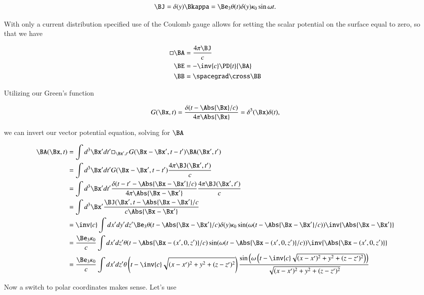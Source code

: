 \begin{equation}\label{eqn:relElectroDynProblemSet5P1:30}
\BJ = \delta(y) \Bkappa = \Be_3 \theta(t) \delta(y) \kappa_0 \sin\omega t.
\end{equation}

With only a current distribution specified use of the Coulomb gauge allows for setting the scalar potential on the surface equal to zero, so that we have

\begin{align}\label{eqn:relElectroDynProblemSet5P1:50}
\square \BA &= \frac{4 \pi \BJ}{c} \\
\BE &= - \inv{c} \PD{t}{\BA} \\
\BB &= \spacegrad \cross \BB
\end{align}

Utilizing our Green's function 

\begin{equation}\label{eqn:relElectroDynProblemSet5P1:70}
G(\Bx, t) = \frac{\delta(t - \Abs{\Bx}/c)}{4 \pi \Abs{\Bx}} = \delta^3(\Bx)\delta(t),
\end{equation}

we can invert our vector potential equation, solving for $\BA$

\begin{align*}
\BA(\Bx, t) 
&= \int d^3 \Bx' dt' \square_{\Bx', t'} G(\Bx - \Bx', t - t') \BA(\Bx', t') \\
&= \int d^3 \Bx' dt' G(\Bx - \Bx', t - t') \frac{4 \pi \BJ(\Bx', t')}{c} \\
&= \int d^3 \Bx' dt' 
\frac{\delta(t - t' - \Abs{\Bx -\Bx'}/c)}{4 \pi \Abs{\Bx - \Bx'}}
\frac{4 \pi \BJ(\Bx', t')}{c} \\
&= \int d^3 \Bx' 
\frac{\BJ(\Bx', t - \Abs{\Bx - \Bx'}/c}{c \Abs{\Bx - \Bx'}} \\
&= \inv{c} \int dx' dy' dz'
\Be_3 \theta(t - \Abs{\Bx -\Bx'}/c) \delta(y) \kappa_0 \sin(\omega(t - \Abs{\Bx -\Bx'}/c))
\inv{\Abs{\Bx - \Bx'}} \\
&= \frac{
\Be_3 \kappa_0
}{c} \int dx' dz'
\theta(t - \Abs{\Bx -(x', 0, z')}/c) 
\sin(\omega(t - \Abs{\Bx -(x', 0, z')}/c))
\inv{\Abs{\Bx - (x', 0, z')}} \\
&= \frac{
\Be_3 \kappa_0
}{c} \int dx' dz'
\theta\left(t - \inv{c} \sqrt{(x-x')^2 + y^2 + (z-z')^2}\right) 
\frac{\sin\left(\omega\left(t - \inv{c} \sqrt{(x-x')^2 + y^2 + (z-z')^2}\right)\right)}{\sqrt{(x-x')^2 + y^2 + (z-z')^2}}
\end{align*}

Now a switch to polar coordinates makes sense.  Let's use

